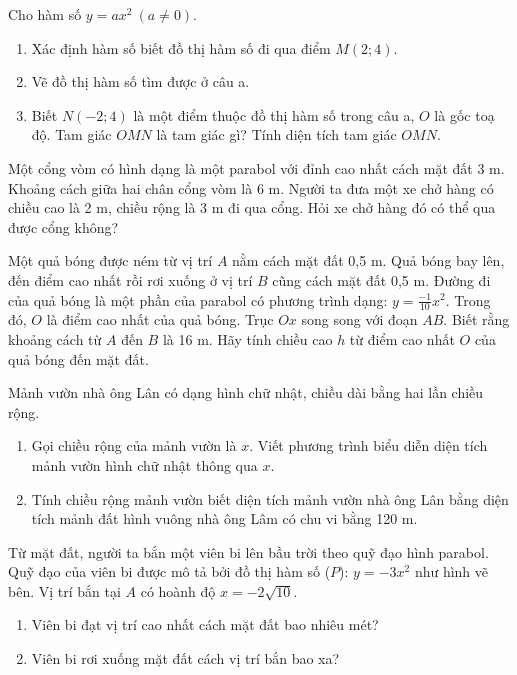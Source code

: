 \documentclass[%
    fontsize=12pt,%
    chapterprefix=false,%
    open=right,%
    twoside=false,%
    numbers=noenddot,%
    headings=optiontohead,%
    final,%
    DIV=15,%
    parskip=half %
]{scrbook}
\begin{document}
\begin{tuluan}
\item Cho hàm số $ y = ax^2 \ (a \neq 0) $.
\begin{enumerate}[label=\alph*)]
  \item[a)] Xác định hàm số biết đồ thị hàm số đi qua điểm $ M(2;4) $.
  \item[b)] Vẽ đồ thị hàm số tìm được ở câu a.
  \item[c)] Biết $ N(-2;4) $ là một điểm thuộc đồ thị hàm số trong câu a, $ O $ là gốc toạ độ. Tam giác $ OMN $ là tam giác gì? Tính diện tích tam giác $ OMN $.
\end{enumerate}

\item Một cổng vòm có hình dạng là một parabol với đỉnh cao nhất cách mặt đất 3 m. Khoảng cách giữa hai chân cổng vòm là 6 m. Người ta đưa một xe chở hàng có chiều cao là 2 m, chiều rộng là 3 m đi qua cổng. Hỏi xe chở hàng đó có thể qua được cổng không?

\item Một quả bóng được ném từ vị trí $ A $ nằm cách mặt đất 0,5 m. Quả bóng bay lên, đến điểm cao nhất rồi rơi xuống ở vị trí $ B $ cũng cách mặt đất 0,5 m. Đường đi của quả bóng là một phần của parabol có phương trình dạng: $ y = \frac{-1}{10} x^2 $. Trong đó, $ O $ là điểm cao nhất của quả bóng. Trục $ Ox $ song song với đoạn $ AB $. Biết rằng khoảng cách từ $ A $ đến $ B $ là 16 m. Hãy tính chiều cao $ h $ từ điểm cao nhất $ O $ của quả bóng đến mặt đất.

\item Mảnh vườn nhà ông Lân có dạng hình chữ nhật, chiều dài bằng hai lần chiều rộng.
\begin{enumerate}[label=\alph*)]
  \item[a)] Gọi chiều rộng của mảnh vườn là $ x $. Viết phương trình biểu diễn diện tích mảnh vườn hình chữ nhật thông qua $ x $.
  \item[b)] Tính chiều rộng mảnh vườn biết diện tích mảnh vườn nhà ông Lân bằng diện tích mảnh đất hình vuông nhà ông Lâm có chu vi bằng 120 m.
\end{enumerate}

\item Từ mặt đất, người ta bắn một viên bi lên bầu trời theo quỹ đạo hình parabol. Quỹ đạo của viên bi được mô tả bởi đồ thị hàm số ($ P $): $ y = -3x^2 $ như hình vẽ bên. Vị trí bắn tại $ A $ có hoành độ $ x = -2\sqrt{10} $.
\begin{enumerate}[label=\alph*)]
  \item[a)] Viên bi đạt vị trí cao nhất cách mặt đất bao nhiêu mét?
  \item[b)] Viên bi rơi xuống mặt đất cách vị trí bắn bao xa?
\end{enumerate}

\end{tuluan}
\end{document}
